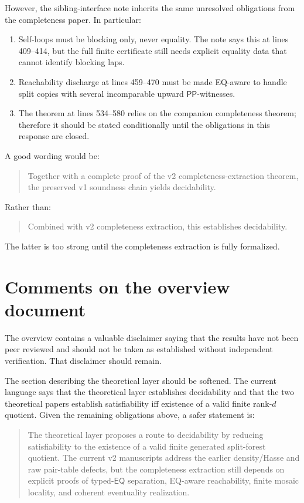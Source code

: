\documentclass[11pt]{article}
\newcommand{\PP}{\mathsf{PP}}
\newcommand{\EQ}{\mathsf{EQ}}
\begin{document}
However, the sibling-interface note inherits the same unresolved obligations
from the completeness paper.  In particular:
\begin{enumerate}[leftmargin=2em]
\item Self-loops must be blocking only, never equality.  The note says this at
  lines 409--414, but the full finite certificate still needs explicit equality
  data that cannot identify blocking laps.
\item Reachability discharge at lines 459--470 must be made EQ-aware to handle
  split copies with several incomparable upward \(\PP\)-witnesses.
\item The theorem at lines 534--580 relies on the companion completeness theorem;
  therefore it should be stated conditionally until the obligations in this
  response are closed.
\end{enumerate}

A good wording would be:
\begin{quote}
Together with a complete proof of the v2 completeness-extraction theorem, the
preserved v1 soundness chain yields decidability.
\end{quote}
Rather than:
\begin{quote}
Combined with v2 completeness extraction, this establishes decidability.
\end{quote}
The latter is too strong until the completeness extraction is fully formalized.

\section{Comments on the overview document}

The overview contains a valuable disclaimer saying that the results have not
been peer reviewed and should not be taken as established without independent
verification.  That disclaimer should remain.

The section describing the theoretical layer should be softened.  The current
language says that the theoretical layer establishes decidability and that the
two theoretical papers establish satisfiability iff existence of a valid finite
rank-\(d\) quotient.  Given the remaining obligations above, a safer statement is:
\begin{quote}
The theoretical layer proposes a route to decidability by reducing
satisfiability to the existence of a valid finite generated split-forest
quotient.  The current v2 manuscripts address the earlier density/Hasse and raw
pair-table defects, but the completeness extraction still depends on explicit
proofs of typed-\(\EQ\) separation, EQ-aware reachability, finite mosaic
locality, and coherent eventuality realization.
\end{quote}
\end{document}
